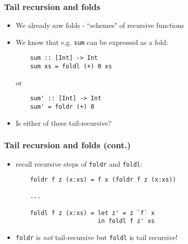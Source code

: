 \documentclass[final,handout]{beamer}
\begin{document}
\begin{frame}[fragile]
    \frametitle{Tail recursion and folds}

    \begin{itemize}
        \item We already saw folds - ``schemes" of recursive functions

        \item We know that e.g. \texttt{sum} can be expressed as a fold:
            \begin{lstlisting}
    sum :: [Int] -> Int
    sum xs = foldl (+) 0 xs
            \end{lstlisting}
            or
            \begin{lstlisting}
    sum' :: [Int] -> Int
    sum' = foldr (+) 0
            \end{lstlisting}

        \item Is either of these tail-recursive? 
    \end{itemize}
\end{frame}

\begin{frame}[fragile]
    \frametitle{Tail recursion and folds (cont.)}

    \begin{itemize}
        \item recall recursive steps of \texttt{foldr} and \texttt{foldl}:

            \begin{lstlisting}
    foldr f z (x:xs) = f x (foldr f z (x:xs))

    ...

    foldl f z (x:xs) = let z' = z `f` x 
                       in foldl f z' xs
            \end{lstlisting}

        \item<2-> \texttt{foldr} is \emph{not} tail-recursive but \texttt{foldl} is
            tail recursive!
    \end{itemize}
\end{frame}
\end{document}
